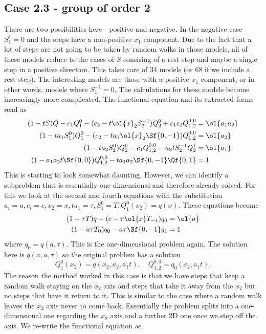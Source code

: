 \subsection{Case 2.3 - group of order 2}
There are two possibilities here - positive and negative. In the negative case $S_1^1 = 0$ and the steps have a non-positive $x_1$ component. Due to the fact that a lot of steps are not going to be taken by random walks in those models, all of these models reduce to the cases of $S$ consising of a rest step and maybe a single step in a positive direction. This takes care of 34 models (or 68 if we include a rest step). The interesting models are those with a positive $x_1$ component, or in other words, models where $S_1^{-1} = 0$. The calculations for these models become increasingly more complicated. The functional equation and its extracted forms read as
\begin{align*}
(1-tS)Q - c_1 Q_1^0- (c_2 -t\ol{x}_2 S_2^{-1})Q_2^0+ c_1c_2 Q_{1,2}^{0,0}  &= \ol{a_1a_2}\\
(1-ta_1 S_1^0)Q_1^0 - (c_2 - ta_1 \ol{x}_2 \Sf{0,-1})Q_{1,2}^{0,0} &=\ol{a_2}\\
(1-ta_2 S_2^0)Q_2^0 - c_1Q_{1,2}^{0,0}  - a_2 t S_2^{-1} Q_2^1&=\ol{a_1}\\
(1-a_1 a_2 t \Sf{0,0})Q_{1,2}^{0,0} - ta_1 a_2 \Sf{0,-1} \Qf{0,1} &= 1
\end{align*}
This is starting to look somewhat daunting. However, we can identify a subproblem that is essentially one-dimensional and therefore already solved. For this we look at the second and fourth equations with the substitution $a_i = a, c_i = c, x_2 = x, ta_1 = \tau, S_1^0 = T, Q_1^0 (x_2)= q(x)$. These equations become
\begin{align*}
(1-\tau T)q - (c - \tau  \ol{x} T_{-1})q_0 &=\ol{a}\\
(1-a \tau T_0)q_0 - a\tau \Sf{0,-1} q_1 &= 1
\end{align*}
where $q_0 = q(a,\tau)$. This is the one-dimensional problem again. The solution here is $q(x,a,\tau)$ so the original problem has a solution
\[
	Q_1^0(x_2) = q(x_2,a_2,a_1t),\quad Q_{1,2}^{0,0} = q_0(a_2,a_1t).
\]
The reason the method worked in this case is that we have steps that keep a random walk staying on the $x_2$ axis and steps that take it away from the $x_2$ but no steps that have it return to it. This is similar to the case where a random walk leaves the $x_2$ axis never to come back. Essentially the problem splits into a one-dimensional one regarding the $x_2$ axis and a further 2D one once we step off the axis. We re-write the functional equation as
